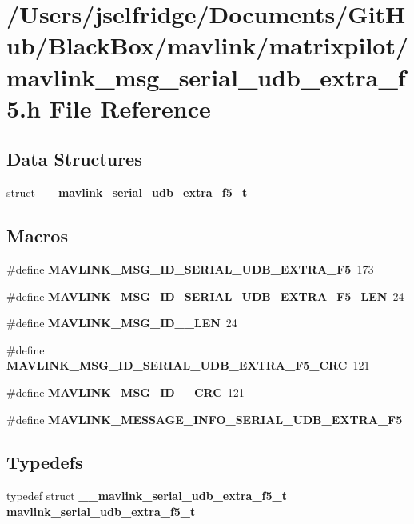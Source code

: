 \section{/\+Users/jselfridge/\+Documents/\+Git\+Hub/\+Black\+Box/mavlink/matrixpilot/mavlink\+\_\+msg\+\_\+serial\+\_\+udb\+\_\+extra\+\_\+f5.h File Reference}
\label{mavlink__msg__serial__udb__extra__f5_8h}
\subsection*{Data Structures}
\begin{DoxyCompactItemize}
\item 
struct \textbf{ \+\_\+\+\_\+mavlink\+\_\+serial\+\_\+udb\+\_\+extra\+\_\+f5\+\_\+t}
\end{DoxyCompactItemize}
\subsection*{Macros}
\begin{DoxyCompactItemize}
\item 
\#define \textbf{ M\+A\+V\+L\+I\+N\+K\+\_\+\+M\+S\+G\+\_\+\+I\+D\+\_\+\+S\+E\+R\+I\+A\+L\+\_\+\+U\+D\+B\+\_\+\+E\+X\+T\+R\+A\+\_\+\+F5}~173
\item 
\#define \textbf{ M\+A\+V\+L\+I\+N\+K\+\_\+\+M\+S\+G\+\_\+\+I\+D\+\_\+\+S\+E\+R\+I\+A\+L\+\_\+\+U\+D\+B\+\_\+\+E\+X\+T\+R\+A\+\_\+\+F5\+\_\+\+L\+EN}~24
\item 
\#define \textbf{ M\+A\+V\+L\+I\+N\+K\+\_\+\+M\+S\+G\+\_\+\+I\+D\+\_\+\_\+\+L\+EN}~24
\item 
\#define \textbf{ M\+A\+V\+L\+I\+N\+K\+\_\+\+M\+S\+G\+\_\+\+I\+D\+\_\+\+S\+E\+R\+I\+A\+L\+\_\+\+U\+D\+B\+\_\+\+E\+X\+T\+R\+A\+\_\+\+F5\+\_\+\+C\+RC}~121
\item 
\#define \textbf{ M\+A\+V\+L\+I\+N\+K\+\_\+\+M\+S\+G\+\_\+\+I\+D\+\_\+\_\+\+C\+RC}~121
\item 
\#define \textbf{ M\+A\+V\+L\+I\+N\+K\+\_\+\+M\+E\+S\+S\+A\+G\+E\+\_\+\+I\+N\+F\+O\+\_\+\+S\+E\+R\+I\+A\+L\+\_\+\+U\+D\+B\+\_\+\+E\+X\+T\+R\+A\+\_\+\+F5}
\end{DoxyCompactItemize}
\subsection*{Typedefs}
\begin{DoxyCompactItemize}
\item 
typedef struct \textbf{ \+\_\+\+\_\+mavlink\+\_\+serial\+\_\+udb\+\_\+extra\+\_\+f5\+\_\+t} \textbf{ mavlink\+\_\+serial\+\_\+udb\+\_\+extra\+\_\+f5\+\_\+t}
\end{DoxyCompactItemize}


